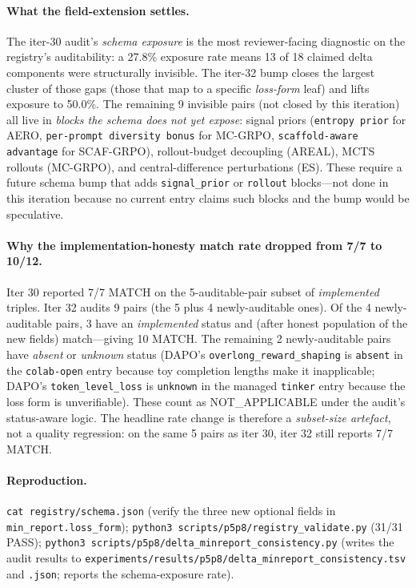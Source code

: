 \paragraph{What the field-extension settles.} The iter-30 audit's
\emph{schema exposure} is the most reviewer-facing diagnostic on the
registry's auditability: a 27.8\% exposure rate means 13 of 18
claimed delta components were structurally invisible. The iter-32 bump
closes the largest cluster of those gaps (those that map to a
specific \emph{loss-form} leaf) and lifts exposure to 50.0\%. The
remaining 9 invisible pairs (not closed by this iteration) all live in
\emph{blocks the schema does not yet expose}: signal priors
(\texttt{entropy prior} for AERO, \texttt{per-prompt diversity bonus}
for MC-GRPO, \texttt{scaffold-aware advantage} for SCAF-GRPO),
rollout-budget decoupling (AREAL), MCTS rollouts (MC-GRPO), and
central-difference perturbations (ES). These require a future
schema bump that adds \texttt{signal\_prior} or \texttt{rollout}
blocks---not done in this iteration because no current entry claims such
blocks and the bump would be speculative.

\paragraph{Why the implementation-honesty match rate dropped from 7/7
to 10/12.} Iter 30 reported 7/7 MATCH on the 5-auditable-pair subset
of \emph{implemented} triples. Iter 32 audits 9 pairs (the 5 plus 4
newly-auditable ones). Of the 4 newly-auditable pairs, 3 have an
\emph{implemented} status and (after honest population of the new
fields) match---giving 10 MATCH. The remaining 2 newly-auditable
pairs have \emph{absent} or \emph{unknown} status (DAPO's
\texttt{overlong\_reward\_shaping} is \texttt{absent} in the
\texttt{colab-open} entry because toy completion lengths make it
inapplicable; DAPO's \texttt{token\_level\_loss} is \texttt{unknown}
in the managed \texttt{tinker} entry because the loss form is
unverifiable). These count as NOT\_APPLICABLE under the audit's
status-aware logic. The headline rate change is therefore a
\emph{subset-size artefact}, not a quality regression: on the same 5
pairs as iter 30, iter 32 still reports 7/7 MATCH.

\paragraph{Reproduction.} \texttt{cat registry/schema.json} (verify the
three new optional fields in \texttt{min\_report.loss\_form});
\texttt{python3 scripts/p5p8/registry\_validate.py} (31/31 PASS);
\texttt{python3 scripts/p5p8/delta\_minreport\_consistency.py}
(writes the audit results to
\texttt{experiments/results/p5p8/delta\_minreport\_consistency.tsv}
and \texttt{.json}; reports the schema-exposure rate).
